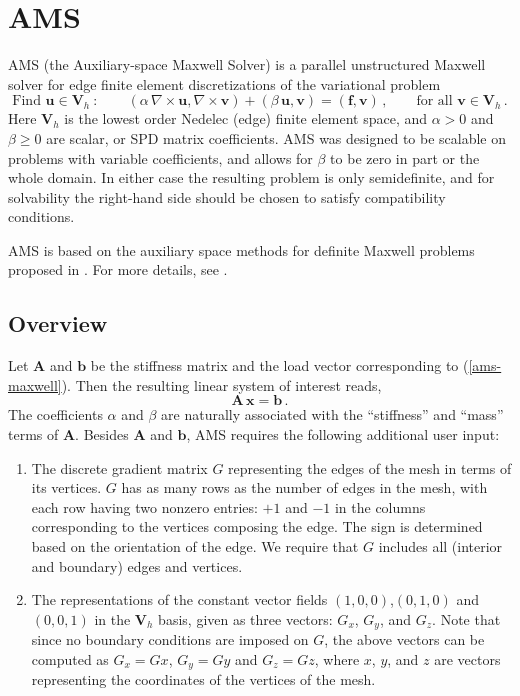 \section{AMS}
\label{AMS}

AMS (the Auxiliary-space Maxwell Solver) is a parallel unstructured Maxwell
solver for edge finite element discretizations of the variational problem
\begin{equation} \label{ams-maxwell}
\mbox{Find } {\mathbf u} \in {\mathbf V}_h \>:\qquad
(\alpha\, \nabla \times {\mathbf u},  \nabla \times {\mathbf v}) +
(\beta\, {\mathbf u},  {\mathbf v}) = ({\mathbf f},  {\mathbf v})\,,
\qquad \mbox{for all } {\mathbf v} \in {\mathbf V}_h \,.
\end{equation}
Here ${\mathbf V}_h$ is the lowest order Nedelec (edge) finite element space,
and $\alpha>0$ and $\beta \ge 0$ are scalar, or SPD matrix coefficients.
AMS was designed to be scalable on problems with variable coefficients,
and allows for $\beta$ to be zero in part or the whole domain.
In either  case the resulting problem is only semidefinite, and for solvability
the right-hand side should be chosen to satisfy compatibility conditions.

AMS is based on the auxiliary space methods for definite Maxwell
problems proposed in \cite{xu_H_curl}.
For more details, see \cite{ams_jcm}.

\subsection{Overview}
Let ${\mathbf A}$ and ${\mathbf b}$ be the stiffness matrix and  the
load vector corresponding to (\ref{ams-maxwell}). Then the resulting
linear system of interest reads,
\begin{equation} \label{ams-maxwell-ls}
{\mathbf A}\, {\mathbf x} = {\mathbf b} \,.
\end{equation}
The coefficients $\alpha$ and $\beta$ are naturally associated with
the ``stiffness'' and ``mass'' terms of ${\mathbf A}$.
Besides ${\mathbf A}$ and ${\mathbf b}$, AMS requires the following
additional user input:
\begin{enumerate}
\item The discrete gradient matrix $G$ representing the edges of
the mesh in terms of its vertices. $G$ has as many rows as the number
of edges in the mesh, with each row having two nonzero entries:
$+1$ and $-1$ in the columns corresponding to the vertices composing
the edge. The sign is determined based on the orientation of the edge.
We require that $G$ includes all (interior and boundary) edges
and vertices.

\item The representations of the constant vector fields $(1,0,0)$,$(0,1,0)$ and
$(0,0,1)$ in the ${\mathbf V}_h$ basis, given as three vectors: $G_x$, $G_y$, and $G_z$.
Note that since no boundary conditions are imposed on $G$, the above vectors
can be computed as $G_x = G x$, $G_y = G y$ and $G_z = G z$, where
$x$, $y$, and $z$ are vectors representing the coordinates of the vertices of the mesh.
\end{enumerate}

